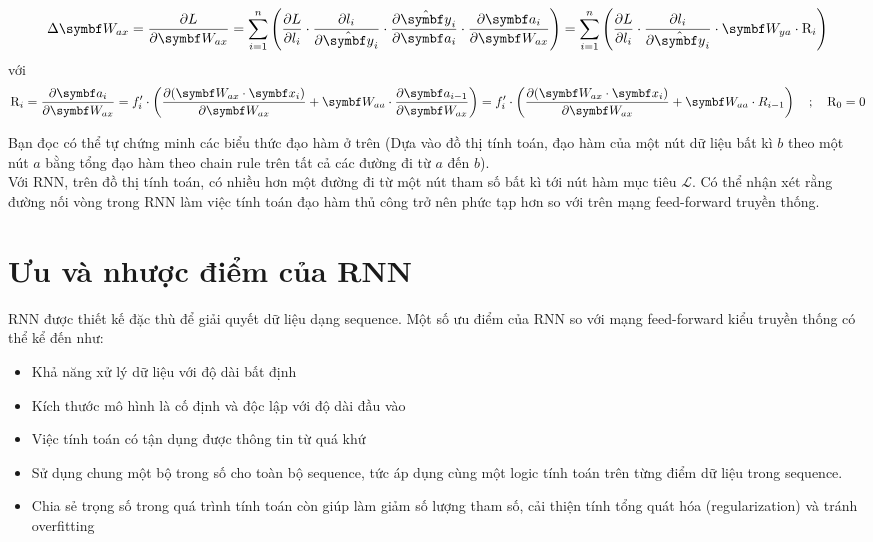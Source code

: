      $$\Delta \symbf W_{ax} = \frac{\partial L}{\partial \symbf W_{ax}}  = \sum_{i=1}^{n}\left(
        \frac{\partial L}{\partial l_i} \cdot
        \frac{\partial l_i}{\partial \hat{\symbf y}_i} \cdot
        \frac{\partial \hat{\symbf y}_i}{\partial \symbf a_i} \cdot
        \frac{\partial \symbf a_i}{\partial \symbf W_{ax}}
     \right) = \sum_{i=1}^{n}\left(
        \frac{\partial L}{\partial l_i} \cdot
        \frac{\partial l_i}{\partial \hat{\symbf y}_i} \cdot
        \symbf W_{ya} \cdot \text R_i
     \right)$$
     với
     $$\text R_i = \frac{\partial \symbf a_i}{\partial \symbf W_{ax}} = f_i' \cdot \left(\frac{\partial (\symbf W_{ax}\cdot \symbf x_i)}{\partial \symbf W_{ax}} + \symbf W_{aa} \cdot \frac{\partial \symbf a_{i-1}}{\partial \symbf W_{ax}}\right) = f_i' \cdot \left(\frac{\partial (\symbf W_{ax}\cdot \symbf x_i)}{\partial \symbf W_{ax}} + \symbf W_{aa} \cdot R_{i-1}\right) \quad ;\quad  \text R_0 = 0 $$

Bạn đọc có thể tự chứng minh các biểu thức đạo hàm ở trên (Dựa vào đồ thị tính toán, đạo hàm của một nút dữ liệu bất kì $b$ theo một nút $a$ bằng tổng đạo hàm theo chain rule trên tất cả các đường đi từ $a$ đến $b$).\\
Với RNN, trên đồ thị tính toán, có nhiều hơn một đường đi từ một nút tham số bất kì tới nút hàm mục tiêu $\mathcal{L}$. Có thể nhận xét rằng đường nối vòng trong RNN làm việc tính toán đạo hàm thủ công trở nên phức tạp hơn so với trên mạng feed-forward truyền thống.

\section{Ưu và nhược điểm của RNN}
RNN được thiết kế đặc thù để giải quyết dữ liệu dạng sequence. Một số ưu điểm của RNN so với mạng feed-forward kiểu truyền thống có thể kể đến như:
\begin{itemize}
    \item Khả năng xử lý dữ liệu với độ dài bất định
    \item Kích thước mô hình là cố định và độc lập với độ dài đầu vào
    \item Việc tính toán có tận dụng được thông tin từ quá khứ
    \item Sử dụng chung một bộ trong số cho toàn bộ sequence, tức áp dụng cùng một logic tính toán trên từng điểm dữ liệu trong sequence.
    \item Chia sẻ trọng số trong quá trình tính toán còn giúp làm giảm số lượng tham số, cải thiện tính tổng quát hóa (regularization) và tránh overfitting
\end{itemize}

